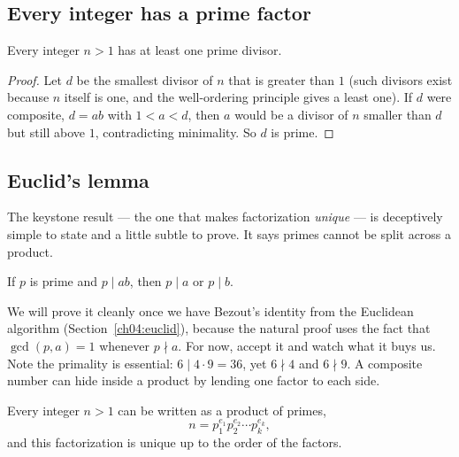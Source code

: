 \subsection*{Every integer has a prime factor}

\begin{lemma}
\label{ch04:lem-has-prime-factor}
Every integer $n > 1$ has at least one prime divisor.
\end{lemma}

\begin{proof}
Let $d$ be the smallest divisor of $n$ that is greater than $1$ (such divisors exist because $n$
itself is one, and the well-ordering principle gives a least one). If $d$ were composite, $d = ab$
with $1 < a < d$, then $a$ would be a divisor of $n$ smaller than $d$ but still above $1$,
contradicting minimality. So $d$ is prime.
\end{proof}

\subsection*{Euclid's lemma}

The keystone result --- the one that makes factorization \emph{unique} --- is deceptively simple to
state and a little subtle to prove. It says primes cannot be split across a product.

\begin{lemma}
\label{ch04:lem-euclid}
If $p$ is prime and $p \mid ab$, then $p \mid a$ or $p \mid b$.
\end{lemma}

We will prove it cleanly once we have Bezout's identity from the Euclidean algorithm
(Section~\ref{ch04:euclid}), because the natural proof uses the fact that $\gcd(p, a) = 1$ whenever
$p \nmid a$. For now, accept it and watch what it buys us. Note the primality is essential:
$6 \mid 4 \cdot 9 = 36$, yet $6 \nmid 4$ and $6 \nmid 9$. A composite number can hide inside a
product by lending one factor to each side.

\begin{theorem}
\label{ch04:thm-fta}
Every integer $n > 1$ can be written as a product of primes,
\[
  n = p_1^{e_1} p_2^{e_2} \cdots p_k^{e_k},
\]
and this factorization is unique up to the order of the factors.
\end{theorem}

